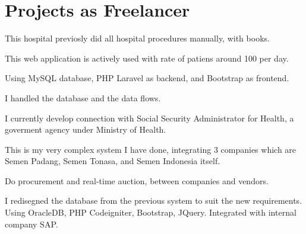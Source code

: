 \documentclass[letterpaper]{deedy-resume} %
\begin{document}
\hfill
\begin{minipage}[t]{0.66\textwidth} %


\section{Projects as Freelancer}

\vspace{\topsep} %
\begin{tightitemize}
\item This hospital previosly did all hospital procedures manually, with books.
\item This web application is actively used with rate of patiens around 100 per day.
\item Using MySQL database, PHP Laravel as backend, and Bootstrap as frontend.
\item I handled the database and the data flows.
\item I currently develop connection with Social Security Administrator for Health, a goverment agency under Ministry of Health.
\end{tightitemize}
\sectionspace

\begin{tightitemize}
\item This is my very complex system I have done, integrating 3 companies which are Semen Padang, Semen Tonasa, and Semen Indonesia itself.
\item Do procurement and real-time auction, between companies and vendors.
\item I redisegned the database from the previous system to suit the new requirements. Using OracleDB, PHP Codeigniter, Bootstrap, JQuery. Integrated with internal company SAP.
\end{tightitemize}
\sectionspace



\end{minipage}
\end{document}
